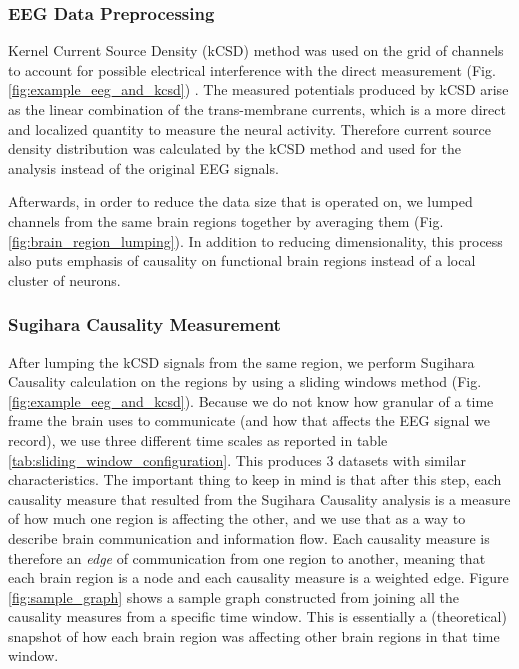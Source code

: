 \subsubsection{EEG Data Preprocessing}
Kernel Current Source Density (kCSD) method was used on the grid of channels to account for possible electrical interference with the direct measurement (Fig. \ref{fig:example_eeg_and_kcsd}) \cite{Potworowski2012}. The measured potentials produced by kCSD arise as the linear combination of the trans-membrane currents, which is a more direct and localized quantity to measure the neural activity. Therefore current source density distribution was calculated by the kCSD method and used for the analysis instead of the original EEG signals.

Afterwards, in order to reduce the data size that is operated on, we lumped channels from the same brain regions together by averaging them (Fig. \ref{fig:brain_region_lumping}). In addition to reducing dimensionality, this process also puts emphasis of causality on functional brain regions instead of a local cluster of neurons. 

\subsubsection{Sugihara Causality Measurement}
After lumping the kCSD signals from the same region, we perform Sugihara Causality calculation on the regions by using a sliding windows method (Fig. \ref{fig:example_eeg_and_kcsd}). Because we do not know how granular of a time frame the brain uses to communicate (and how that affects the EEG signal we record), we use three different time scales as reported in table \ref{tab:sliding_window_configuration}. This produces 3 datasets with similar characteristics. The important thing to keep in mind is that after this step, each causality measure that resulted from the Sugihara Causality analysis is a measure of how much one region is affecting the other, and we use that as a way to describe brain communication and information flow. Each causality measure is therefore an \textit{edge} of communication from one region to another, meaning that each brain region is a node and each causality measure is a weighted edge. Figure \ref{fig:sample_graph} shows a sample graph constructed from joining all the causality measures from a specific time window. This is essentially a (theoretical) snapshot of how each brain region was affecting other brain regions in that time window.

